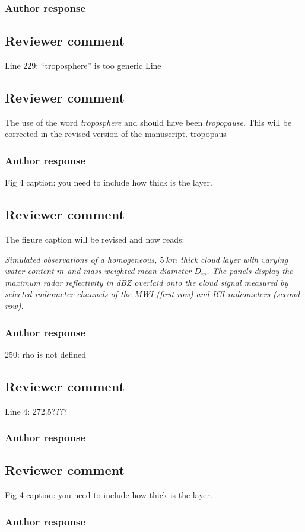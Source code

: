 \documentclass[11pt]{scrartcl}
\begin{document}
\subsubsection*{Author response}

\subsection*{Reviewer comment}
Line 229: “troposphere” is too generic Line

\subsection*{Reviewer comment}

The use of the word \textit{troposphere} and should have been \textit{tropopause}.
This will be corrected in the revised version of the manuscript.
tropopaus


\subsubsection*{Author response}
Fig 4 caption: you need to include how thick is the layer.

\subsection*{Reviewer comment}

The figure caption will be revised and now reads:

\textit{Simulated observations of a homogeneous, $5\ \unit{km}$ thick cloud
  layer with varying water content $m$ and mass-weighted mean diameter $D_m$.
  The panels display the maximum radar reflectivity in dBZ overlaid onto the
  cloud signal measured by selected radiometer channels of the MWI (first row)
  and ICI radiometers (second row).}

\subsubsection*{Author response}
250: rho is not defined

\subsection*{Reviewer comment}
Line 4: 272.5????

\subsubsection*{Author response}

\subsection*{Reviewer comment}
Fig 4 caption: you need to include how thick is the layer.

\subsubsection*{Author response}
\end{document}
